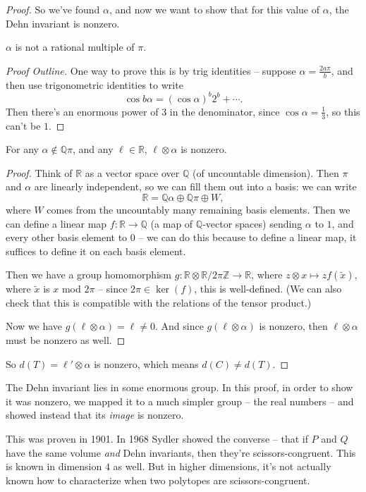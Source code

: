 \begin{proof}
    So we've found $\alpha$, and now we want to show that for this value of $\alpha$, the Dehn invariant is nonzero. 

    \begin{claim}
        $\alpha$ is not a rational multiple of $\pi$. 
    \end{claim}
    
    \begin{proof}[Proof Outline]
        One way to prove this is by trig identities -- suppose $\alpha = \frac{2a\pi}{b}$, and then use trigonometric identities to write \[\cos b\alpha = (\cos \alpha)^b2^b + \cdots.\] Then there's an enormous power of $3$ in the denominator, since $\cos \alpha = \frac{1}{3}$, so this can't be $1$.  
    \end{proof}

    \begin{claim}
        For any $\alpha \not\in \mathbb{Q}\pi$, and any $\ell \in \mathbb{R}$, $\ell \otimes \alpha$ is nonzero. 
    \end{claim}

    \begin{proof}
        Think of $\mathbb{R}$ as a vector space over $\mathbb{Q}$ (of uncountable dimension). Then $\pi$ and $\alpha$ are linearly independent, so we can fill them out into a basis: we can write \[\mathbb{R} = \mathbb{Q}\alpha \oplus \mathbb{Q}\pi \oplus W,\] where $W$ comes from the uncountably many remaining basis elements. Then we can define a linear map $f : \mathbb{R} \to \mathbb{Q}$ (a map of $\mathbb{Q}$-vector spaces) sending $\alpha$ to $1$, and every other basis element to $0$ -- we can do this because to define a linear map, it suffices to define it on each basis element. 
        
        Then we have a group homomorphism $g : \mathbb{R} \otimes \mathbb{R}/2\pi\mathbb{Z} \to \mathbb{R}$, where $z \otimes x \mapsto z f(\tilde{x})$, where $\tilde{x}$ is $x$ mod $2\pi$ -- since $2\pi \in \ker(f)$, this is well-defined. (We can also check that this is compatible with the relations of the tensor product.)
        
        Now we have $g(\ell \otimes \alpha) = \ell \neq 0$. And since $g(\ell \otimes \alpha)$ is nonzero, then $\ell \otimes \alpha$ must be nonzero as well.
    \end{proof}

    So $d(T) = \ell' \otimes \alpha$ is nonzero, which means $d(C) \neq d(T)$. 
\end{proof}

The Dehn invariant lies in some enormous group. In this proof, in order to show it was nonzero, we mapped it to a much simpler group -- the real numbers -- and showed instead that its \emph{image} is nonzero. 

\begin{note}
This was proven in 1901. In 1968 Sydler showed the converse -- that if $P$ and $Q$ have the same volume \emph{and} Dehn invariants, then they're scissors-congruent. This is known in dimension $4$ as well. But in higher dimensions, it's not actually known how to characterize when two polytopes are scissors-congruent. 
\end{note}
\newpage